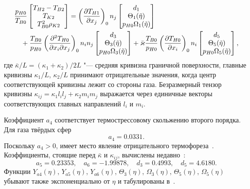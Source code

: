 \begin{gather}
\begin{multlined}
    \end{multlined}\label{eq:kgf:boundary_u2n}\\
    \begin{multlined}
        \frac{p_{H0}}{T_{B0}}
            \begin{bmatrix} T_{H2} - T_{B2} \\ T_{K2} \\ T_{B0}^2\rho_{K2} \end{bmatrix} =
        \onwall{\pder[T_{H1}]{x_j}} n_j
            \begin{bmatrix} d_1 \\ \Theta_1(\tilde\eta) \\ p_{H0}\Omega_1(\tilde\eta) \end{bmatrix} \\
        + \frac{T_{B0}}{p_{H0}}\onwall{\pderder[T_{H0}]{x_i}{x_j}} n_i n_j
            \begin{bmatrix} d_3 \\ \Theta_3(\tilde\eta) \\ p_{H0}\Omega_3(\tilde\eta) \end{bmatrix}
        + \bar\kappa\frac{T_{B0}}{p_{H0}}\onwall{\pder[T_{H0}]{x_i}} n_i
            \begin{bmatrix} d_5 \\ \Theta_5(\tilde\eta) \\ p_{H0}\Omega_5(\tilde\eta) \end{bmatrix},
    \end{multlined}\label{eq:kgf:boundary_T2}
\end{gather}
где \(\bar\kappa/L = (\kappa_1+\kappa_2)/2L\) "--- средняя кривизна граничной поверхности,
главные кривизны \(\kappa_1/L\), \(\kappa_2/L\) принимают отрицательные значения,
когда центр соответствующей кривизны лежит со стороны газа.
Безразмерный тензор кривизны \(\kappa_{ij} = \kappa_1 l_i l_j + \kappa_2 m_i m_j\)
выражается через единичные векторы соответствующих главных направлений \(l_i\) и \(m_i\).

Коэффициент \(a_4\) соответствует термострессовому скольжению второго порядка.
Для газа твёрдых сфер~\cite{Ohwada1992, Takata2015}
\begin{equation}\label{eq:a4_coeff}
    a_4 = 0.0331.
\end{equation}
Поскольку \(a_4>0\), имеет место явление отрицательного термофореза~\cite{Ohwada1992}.
Коэффициенты, стоящие перед \(\bar\kappa\) и \(\kappa_{ij}\),
вычислены недавно~\cite{Takata2015curvature, Takata2015}:
\begin{equation}\label{eq:curvature_coeffs}
    a_5 = 0.23353, \quad a_6 = -1.99878, \quad d_3 = 0.4993, \quad d_5 = 4.6180.
\end{equation}
Функции \(Y_{a4}(\eta)\), \(Y_{a5}(\eta)\), \(Y_{a6}(\eta)\), \(\Theta_3(\eta)\),
\(\Omega_3(\eta)\), \(\Theta_5(\eta)\), \(\Omega_5(\eta)\) убывают также экспоненциально от \(\eta\)
и табулированы в~\cite{Ohwada1992, Sone2002, Sone2007, Takata2015curvature, Takata2015}.

